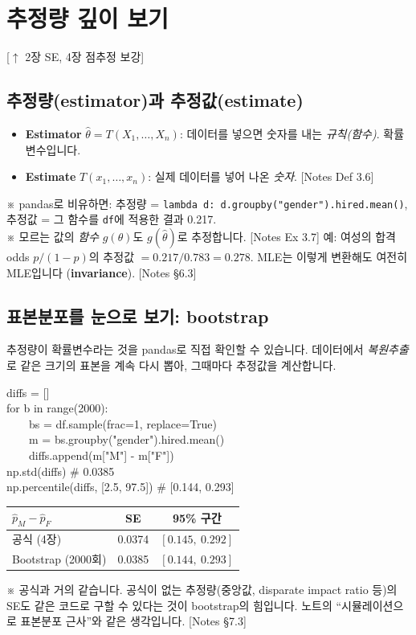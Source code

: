 \documentclass[11pt,a4paper]{article}
\newcommand{\term}[1]{\textbf{#1}}
\newcommand{\code}[1]{\texttt{#1}}
\newcommand{\nref}[1]{{\footnotesize\textsf{\color{blue!55!black}[Notes #1]}}}
\newcommand{\aside}[1]{{\footnotesize\color{black!65}#1}}
\newcommand{\linkup}[1]{{\footnotesize\textsf{\color{green!40!black}[$\uparrow$ #1 보강]}}}
\begin{document}
\section{추정량 깊이 보기}
\linkup{2장 SE, 4장 점추정}

\subsection{추정량(estimator)과 추정값(estimate)}
\begin{itemize}
\item \term{Estimator} $\hat\theta=T(X_1,\dots,X_n)$: 데이터를 넣으면 숫자를 내는 \emph{규칙(함수)}. 확률변수입니다.
\item \term{Estimate} $T(x_1,\dots,x_n)$: 실제 데이터를 넣어 나온 \emph{숫자}. \nref{Def 3.6}
\end{itemize}
\aside{※ pandas로 비유하면: 추정량 = \code{lambda d: d.groupby("gender").hired.mean()}, 추정값 = 그 함수를 \code{df}에 적용한 결과 0.217.}\\
\aside{※ 모르는 값의 \emph{함수} $g(\theta)$도 $g(\hat\theta)$로 추정합니다. \nref{Ex 3.7} 예: 여성의 합격 odds $p/(1-p)$의 추정값 $=0.217/0.783=0.278$. MLE는 이렇게 변환해도 여전히 MLE입니다 (\term{invariance}). \nref{§6.3}}

\subsection{표본분포를 눈으로 보기: bootstrap}
추정량이 확률변수라는 것을 pandas로 직접 확인할 수 있습니다. 데이터에서 \emph{복원추출}로 같은 크기의 표본을 계속 다시 뽑아, 그때마다 추정값을 계산합니다.
\begin{codebox}
diffs = []\\
for b in range(2000):\\
\ \ \ \ bs = df.sample(frac=1, replace=True)\\
\ \ \ \ m = bs.groupby("gender").hired.mean()\\
\ \ \ \ diffs.append(m["M"] - m["F"])\\
np.std(diffs) \hfill \# 0.0385\\
np.percentile(diffs, [2.5, 97.5]) \hfill \# [0.144, 0.293]
\end{codebox}
\begin{center}
\begin{tabular}{@{}l c c@{}}
\toprule
$\hat p_M-\hat p_F$ & SE & 95\% 구간 \\
\midrule
공식 (4장) & 0.0374 & $[0.145,\ 0.292]$ \\
Bootstrap (2000회) & 0.0385 & $[0.144,\ 0.293]$ \\
\bottomrule
\end{tabular}
\end{center}
\aside{※ 공식과 거의 같습니다. 공식이 없는 추정량(중앙값, disparate impact ratio 등)의 SE도 같은 코드로 구할 수 있다는 것이 bootstrap의 힘입니다. 노트의 ``시뮬레이션으로 표본분포 근사''와 같은 생각입니다. \nref{§7.3}}
\end{document}
